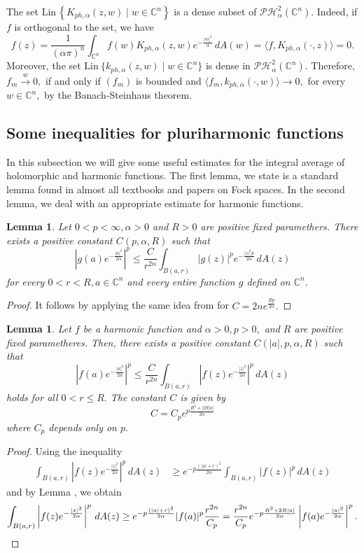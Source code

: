 \documentclass[10pt,leqno]{amsart}
\newtheorem{lemma}[theorem]{Lemma}
\theoremstyle{remark}
\numberwithin{equation}{section}
\newcommand{\hph}{\mathcal{PH}_\alpha^2(\mathbb{C}^n)}%
\newcommand{\Kph}{K_{ph,\alpha}}%
\newcommand{\kph}{k_{ph,\alpha}}%
\newcommand{\wto}{\stackrel{w}{\to}}%
\begin{document}
The set $\mathrm{Lin}\, \left\{ \Kph(z,w) \mid w \in \mathbb{C}^{n} \right\} $ is a dense subset of $\hph.$ Indeed, if $f$ is orthogonal to the set, we have
\[
	f(z)=\frac{1}{\left( \alpha \pi \right) ^{n}}\int_{\mathbb{C}^{n}}^{}f(w) \Kph(z,w) e^{-\frac{|w|^2}{\alpha}}\, dA(w)= \langle f,\Kph(\cdot,z) \rangle = 0.
\]
Moreover, the set $\mathrm{Lin} \ \{\kph (z,w) \mid w \in \mathbb{C}^{n}\}$ is dense in $\hph.$ Therefore, $f_m \wto 0,$ if and only if $(f_m)$ is bounded and  $\langle f_m,\kph(\cdot,w) \rangle \to 0,$ for every $w \in \mathbb{C}^{n},$ by the Banach-Steinhaus theorem.

\subsection{Some inequalities for pluriharmonic functions}
In this subsection we will give some useful estimates for the integral average of holomorphic and harmonic functions. The first lemma, we state is a standard lemma found in almost all textbooks and papers on Fock spaces. In the second lemma, we deal with an appropriate estimate for harmonic functions.
\begin{lemma}\label{lm:point-evaluation-on-arbitrary-balls}
	Let $0<p<\infty,\alpha>0$ and $R>0$ are positive fixed paramethers. There exists a positive constant $C(p,\alpha,R)$ such that
	\[
		\left| g(a)e^{-\frac{|a|^2}{2\alpha}} \right| ^{p}\leq \frac{C}{r^{2n}}\int_{B(a,r)}^{}\left| g(z) \right| ^{p}e^{-\frac{|z|^2p}{2\alpha}}\, dA(z)
	\]
	for every $0<r<R, a \in \mathbb{C}^{n}$ and every entire function $g$ defined on $\mathbb{C}^{n}.$
\end{lemma}
\begin{proof}
	It follows by applying the same idea from \cite[Lemma 2.32]{KeheZhuAnalysisOnFockSpaces} for $C=2n e^{\frac{Rp}{2\alpha}}.$
\end{proof}
\begin{lemma}\label{lm:local-point-evaluation-estimate-for-harmonic-functions}
	Let $f$ be a harmonic function and $\alpha>0,p>0,$ and $R$ are positive fixed parametheres. Then, there exists a positive constant $C(|a|,p,\alpha,R)$ such that
	\[
		\left| f(a) e^{-\frac{|a|^2}{2\alpha}} \right| ^{p}\leq \frac{C}{r^{2n}}\int_{B(a,r)}^{}\left| f(z)e^{-\frac{|z|^2}{2\alpha}} \right| ^{p}\, dA(z)
	\]
	holds for all $0<r\leq R.$
	The constant $C$ is given by
	\[
		C=C_p e^{p\frac{R^2+2R|a|}{2\alpha}}
	\]
	where $C_p$ depends only on $p.$
\end{lemma}
\begin{proof}
	Using the inequality
	\begin{align*}
		\int_{B(a,r)}^{}\left| f(z)e^{-\frac{|z|^2}{2\alpha}} \right| ^{p}\, dA(z) & \geq e^{-p\frac{(|a|+r)^2}{2\alpha}} \int_{B(a,r)}^{}|f(z)|^p\, dA(z)
	\end{align*}
	and by Lemma \cite[Lemma 2, p. 172]{feffermanHpSpacesSeveral1972}, we obtain
	\[
		\int_{B(a,r)}^{}\left| f(z)e^{-\frac{|z|^2}{2\alpha}} \right| ^{p}\, dA(z) \geq e^{-p\frac{(|a|+r)^2}{2\alpha}} |f(a)|^p \frac{r^{2n}}{C_p} = \frac{r^{2n}}{C_p} e^{-p\frac{R^2+2R|a|}{2\alpha}} \left| f(a) e^{-\frac{|a|^2}{2\alpha}} \right| ^{p}. \qedhere
	\]
\end{proof}
\end{document}
